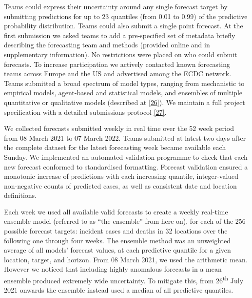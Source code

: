 \documentclass[
]{article}
\begin{document}
Teams could express their uncertainty around any single forecast target by submitting predictions for up to 23 quantiles (from 0.01 to 0.99) of the predictive probability distribution. Teams could also submit a single point forecast. At the first submission we asked teams to add a pre-specified set of metadata briefly describing the forecasting team and methods (provided online and in supplementary information). No restrictions were placed on who could submit forecasts. To increase participation we actively contacted known forecasting teams across Europe and the US and advertised among the ECDC network. Teams submitted a broad spectrum of model types, ranging from mechanistic to empirical models, agent-based and statistical models, and ensembles of multiple quantitative or qualitative models (described at \protect\hyperlink{ref-europeancovid-19forecasthubCommunity}{{[}26{]}}). We maintain a full project specification with a detailed submissions protocol \protect\hyperlink{ref-europeancovid-19forecasthubCovid19forecasthubeuropeWiki}{{[}27{]}}.

We collected forecasts submitted weekly in real time over the 52 week period from 08 March 2021 to 07 March 2022. Teams submitted at latest two days after the complete dataset for the latest forecasting week became available each Sunday. We implemented an automated validation programme to check that each new forecast conformed to standardised formatting. Forecast validation ensured a monotonic increase of predictions with each increasing quantile, integer-valued non-negative counts of predicted cases, as well as consistent date and location definitions.

Each week we used all available valid forecasts to create a weekly real-time ensemble model (referred to as ``the ensemble'' from here on), for each of the 256 possible forecast targets: incident cases and deaths in 32 locations over the following one through four weeks. The ensemble method was an unweighted average of all models' forecast values, at each predictive quantile for a given location, target, and horizon. From 08 March 2021, we used the arithmetic mean. However we noticed that including highly anomalous forecasts in a mean ensemble produced extremely wide uncertainty. To mitigate this, from 26\textsuperscript{th} July 2021 onwards the ensemble instead used a median of all predictive quantiles.
\end{document}
